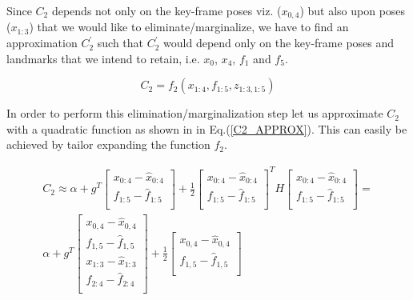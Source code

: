 Since $C_2$ depends not only on the key-frame poses viz. ($x_{0,4}$) but also upon poses ($x_{1:3}$) that we would like to eliminate/marginalize, we have to find an approximation $C_2^{'}$ such that $C_2^{'}$ would depend only on the key-frame poses and landmarks that we intend to retain, i.e. $x_0$, $x_4$, $f_1$ and $f_5$. 

\begin{equation}
C_2 = f_2(x_{1:4}, f_{1:5}, z_{1:3, 1:5})
\label{FULL_C2_COST}
\end{equation}

In order to perform this elimination/marginalization step let us approximate $C_2$ with a quadratic function as shown in in Eq.(\ref{C2_APPROX}). This can easily be achieved by tailor expanding the function $f_2$.

\begin{equation}
\begin{split}
C_2 \approx \alpha + g^T\begin{bmatrix} x_{0:4} - \hat x_{0:4} \\ 
                                  f_{1:5} - \hat f_{1:5}\\
									\end{bmatrix} 
									+ \frac{1}{2} \begin{bmatrix} x_{0:4} - \hat x_{0:4} \\ 
                                        f_{1:5} - \hat f_{1:5}\\
									              \end{bmatrix}^T H 
												\begin{bmatrix} x_{0:4} - \hat x_{0:4} \\ 
                                        f_{1:5} - \hat f_{1:5}\\
									      \end{bmatrix} = \\
		\alpha + g^T\begin{bmatrix} x_{0,4} - \hat x_{0,4}\\ 
                                f_{1,5} - \hat f_{1,5}\\
																x_{1:3} - \hat x_{1:3}\\ 
                                f_{2:4} - \hat f_{2:4}\\
									\end{bmatrix} 
									+ \frac{1}{2} \begin{bmatrix} x_{0,4} - \hat x_{0,4}\\ 
                                                f_{1,5} - \hat f_{1,5}\\

\end{bmatrix}
\end{split}
\end{equation}
